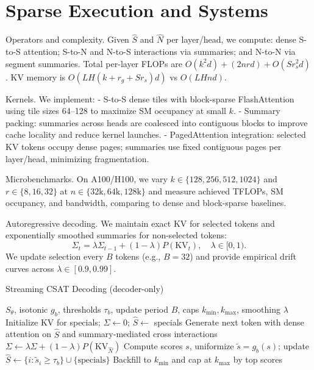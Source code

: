 \documentclass[11pt]{article}
\begin{document}
\section{Sparse Execution and Systems}
Operators and complexity. Given $\hat{S}$ and $\hat{N}$ per layer/head, we compute: dense S-to-S attention; S-to-N and N-to-S interactions via summaries; and N-to-N via segment summaries. Total per-layer FLOPs are $O(k^2 d)+(2n r d)+O(S r_s^2 d)$. KV memory is $O(L H (k + r_g + S r_s)d)$ vs $O(L H n d)$.

Kernels. We implement:
- S-to-S dense tiles with block-sparse FlashAttention using tile sizes 64–128 to maximize SM occupancy at small $k$.
- Summary packing: summaries across heads are coalesced into contiguous blocks to improve cache locality and reduce kernel launches.
- PagedAttention integration: selected KV tokens occupy dense pages; summaries use fixed contiguous pages per layer/head, minimizing fragmentation.

Microbenchmarks. On A100/H100, we vary $k\in\{128,256,512,1024\}$ and $r\in\{8,16,32\}$ at $n\in\{32\text{k},64\text{k},128\text{k}\}$ and measure achieved TFLOPs, SM occupancy, and bandwidth, comparing to dense and block-sparse baselines.

Autoregressive decoding. We maintain exact KV for selected tokens and exponentially smoothed summaries for non-selected tokens:
\[
\Sigma_t = \lambda \Sigma_{t-1} + (1-\lambda) P(\text{KV}_t), \quad \lambda\in[0,1).
\]
We update selection every $B$ tokens (e.g., $B{=}32$) and provide empirical drift curves across $\lambda\in[0.9,0.99]$.

\begin{algorithm}[t]
\caption{Streaming CSAT Decoding (decoder-only)}
\label{alg:stream}
\begin{algorithmic}[1]
\Require $S_\theta$, isotonic $g_b$, thresholds $\tau_b$, update period $B$, caps $k_{\min},k_{\max}$, smoothing $\lambda$
\State Initialize KV for specials; $\Sigma\gets 0$; $\hat{S}\gets$ specials
  \State Generate next token with dense attention on $\hat{S}$ and summary-mediated cross interactions
  \State $\Sigma \gets \lambda \Sigma + (1-\lambda) P(\text{KV}_{\hat{N}})$
    \State Compute scores $s$, uniformize $\tilde{s}=g_b(s)$; update $\hat{S}\gets\{i:\tilde{s}_i\ge \tau_b\}\cup\{\text{specials}\}$
    \State Backfill to $k_{\min}$ and cap at $k_{\max}$ by top scores
  \Fi
\EndFor
\end{algorithmic}
\end{algorithm}
\end{document}

